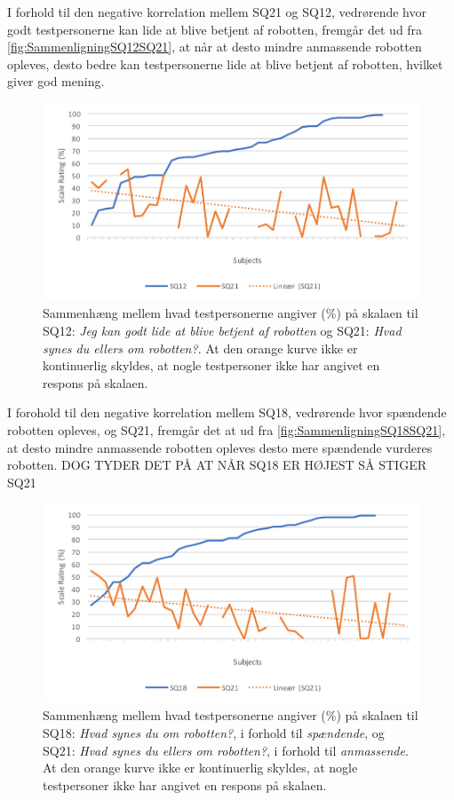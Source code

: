 \noindent
I forhold til den negative korrelation mellem SQ21 og SQ12, vedrørende hvor godt testpersonerne kan lide at blive betjent af robotten, fremgår det ud fra \autoref{fig:SammenligningSQ12SQ21}, at når at desto mindre anmassende robotten opleves, desto bedre kan testpersonerne lide at blive betjent af robotten, hvilket giver god mening. 
%
\begin{figure}[H]
	\centering
	\includegraphics[width=\textwidth]{Figure/Korrelationsgrafer/SQ12+SQ21}
	\caption{Sammenhæng mellem hvad testpersonerne angiver (\%) på skalaen til SQ12: \textit{Jeg kan godt lide at blive betjent af robotten} og SQ21: \textit{Hvad synes du ellers om robotten?}. At den orange kurve ikke er kontinuerlig skyldes, at nogle testpersoner ikke har angivet en respons på skalaen.}
	\label{fig:SammenligningSQ12SQ21}
\end{figure}
\noindent
%
I forohold til den negative korrelation mellem SQ18, vedrørende hvor spændende robotten opleves, og SQ21, fremgår det at ud fra \autoref{fig:SammenligningSQ18SQ21}, at desto mindre anmassende robotten opleves desto mere spændende vurderes robotten. DOG TYDER DET PÅ AT NÅR SQ18 ER HØJEST SÅ STIGER SQ21
%
\begin{figure}[H]
	\centering
	\includegraphics[width=\textwidth]{Figure/Korrelationsgrafer/SQ18+SQ21}
	\caption{Sammenhæng mellem hvad testpersonerne angiver (\%) på skalaen til SQ18: \textit{Hvad synes du om robotten?}, i forhold til \textit{spændende}, og SQ21: \textit{Hvad synes du ellers om robotten?}, i forhold til \textit{anmassende}. At den orange kurve ikke er kontinuerlig skyldes, at nogle testpersoner ikke har angivet en respons på skalaen.}
	\label{fig:SammenligningSQ18SQ21}
\end{figure}
